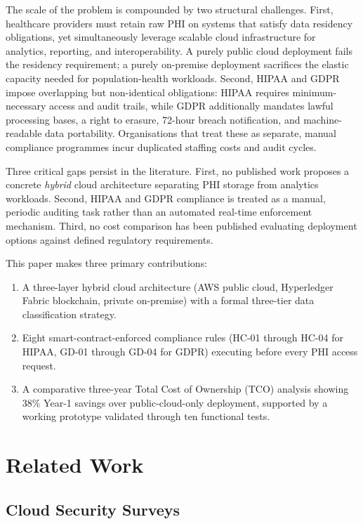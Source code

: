 \documentclass[10pt,twocolumn,a4paper]{article}
\begin{document}
The scale of the problem is compounded by two structural challenges.
First, healthcare providers must retain raw PHI on systems that satisfy
data residency obligations, yet simultaneously leverage scalable cloud
infrastructure for analytics, reporting, and interoperability. A purely
public cloud deployment fails the residency requirement; a purely
on-premise deployment sacrifices the elastic capacity needed for
population-health workloads. Second, HIPAA and GDPR impose overlapping
but non-identical obligations: HIPAA requires minimum-necessary access
and audit trails, while GDPR additionally mandates lawful processing
bases, a right to erasure, 72-hour breach notification, and machine-readable
data portability. Organisations that treat these as separate, manual
compliance programmes incur duplicated staffing costs and audit cycles.

Three critical gaps persist in the literature. First, no published work
proposes a concrete \textit{hybrid} cloud architecture separating PHI
storage from analytics workloads. Second, HIPAA and GDPR compliance is
treated as a manual, periodic auditing task rather than an automated
real-time enforcement mechanism. Third, no cost comparison has been
published evaluating deployment options against defined regulatory
requirements.

This paper makes three primary contributions:
\begin{enumerate}[leftmargin=*,itemsep=0pt,topsep=2pt]
  \item A three-layer hybrid cloud architecture (AWS public cloud,
        Hyperledger Fabric blockchain, private on-premise) with a formal
        three-tier data classification strategy.
  \item Eight smart-contract-enforced compliance rules (HC-01 through HC-04
        for HIPAA, GD-01 through GD-04 for GDPR) executing before every PHI
        access request.
  \item A comparative three-year Total Cost of Ownership (TCO) analysis
        showing 38\% Year-1 savings over public-cloud-only deployment,
        supported by a working prototype validated through ten functional tests.
\end{enumerate}

\section{Related Work}

\subsection{Cloud Security Surveys}
\end{document}
